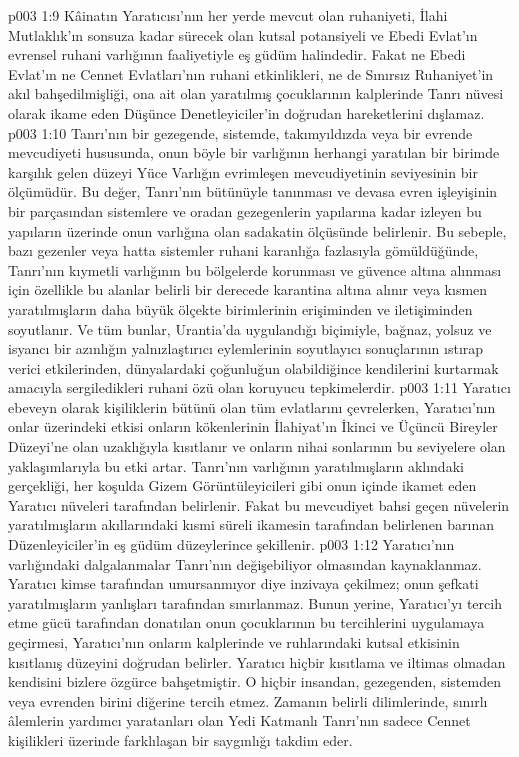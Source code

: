 \vs p003 1:9 Kâinatın Yaratıcısı’nın her yerde mevcut olan ruhaniyeti, İlahi Mutlaklık’ın sonsuza kadar sürecek olan kutsal potansiyeli ve Ebedi Evlat’ın evrensel ruhani varlığının faaliyetiyle eş güdüm halindedir. Fakat ne Ebedi Evlat’ın ne Cennet Evlatları’nın ruhani etkinlikleri, ne de Sınırsız Ruhaniyet’in akıl bahşedilmişliği, ona ait olan yaratılmış çocuklarının kalplerinde Tanrı nüvesi olarak ikame eden Düşünce Denetleyiciler’in doğrudan hareketlerini dışlamaz.
\vs p003 1:10 Tanrı’nın bir gezegende, sistemde, takımyıldızda veya bir evrende mevcudiyeti hususunda, onun böyle bir varlığının herhangi yaratılan bir birimde karşılık gelen düzeyi Yüce Varlığın evrimleşen mevcudiyetinin seviyesinin bir ölçümüdür. Bu değer, Tanrı’nın bütünüyle tanınması ve devasa evren işleyişinin bir parçasından sistemlere ve oradan gezegenlerin yapılarına kadar izleyen bu yapıların üzerinde onun varlığına olan sadakatin ölçüsünde belirlenir. Bu sebeple, bazı gezenler veya hatta sistemler ruhani karanlığa fazlasıyla gömüldüğünde, Tanrı’nın kıymetli varlığının bu bölgelerde korunması ve güvence altına alınması için özellikle bu alanlar belirli bir derecede karantina altına alınır veya kısmen yaratılmışların daha büyük ölçekte birimlerinin erişiminden ve iletişiminden soyutlanır. Ve tüm bunlar, Urantia’da uygulandığı biçimiyle, bağnaz, yolsuz ve isyancı bir azınlığın yalnızlaştırıcı eylemlerinin soyutlayıcı sonuçlarının ıstırap verici etkilerinden, dünyalardaki çoğunluğun olabildiğince kendilerini kurtarmak amacıyla sergiledikleri ruhani özü olan koruyucu tepkimelerdir.
\vs p003 1:11 Yaratıcı ebeveyn olarak kişiliklerin bütünü olan tüm evlatlarını çevrelerken, Yaratıcı’nın onlar üzerindeki etkisi onların kökenlerinin İlahiyat’ın İkinci ve Üçüncü Bireyler Düzeyi’ne olan uzaklığıyla kısıtlanır ve onların nihai sonlarının bu seviyelere olan yaklaşımlarıyla bu etki artar. Tanrı’nın varlığının yaratılmışların aklındaki gerçekliği, her koşulda Gizem Görüntüleyicileri gibi onun içinde ikamet eden Yaratıcı nüveleri tarafından belirlenir. Fakat bu  mevcudiyet bahsi geçen nüvelerin yaratılmışların akıllarındaki kısmi süreli ikamesin tarafından belirlenen barınan Düzenleyiciler’in eş güdüm düzeylerince şekillenir.
\vs p003 1:12 Yaratıcı’nın varlığındaki dalgalanmalar Tanrı’nın değişebiliyor olmasından kaynaklanmaz. Yaratıcı kimse tarafından umursanmıyor diye inzivaya çekilmez; onun şefkati yaratılmışların yanlışları tarafından sınırlanmaz. Bunun yerine, Yaratıcı’yı tercih etme gücü tarafından donatılan onun çocuklarının bu tercihlerini uygulamaya geçirmesi, Yaratıcı’nın onların kalplerinde ve ruhlarındaki kutsal etkisinin kısıtlanış düzeyini doğrudan belirler. Yaratıcı hiçbir kısıtlama ve iltimas olmadan kendisini bizlere özgürce bahşetmiştir. O hiçbir insandan, gezegenden, sistemden veya evrenden birini diğerine tercih etmez. Zamanın belirli dilimlerinde, sınırlı âlemlerin yardımcı yaratanları olan Yedi Katmanlı Tanrı’nın sadece Cennet kişilikleri üzerinde farklılaşan bir saygınlığı takdim eder.
